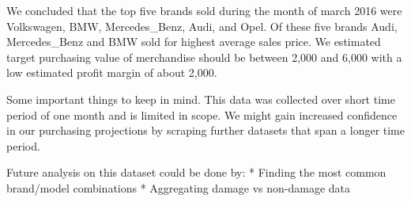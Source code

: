 \documentclass[11pt]{article}
\begin{document}
    We concluded that the top five brands sold during the month of march
2016 were Volkswagen, BMW, Mercedes\_Benz, Audi, and Opel. Of these five
brands Audi, Mercedes\_Benz and BMW sold for highest average sales
price. We estimated target purchasing value of merchandise should be
between 2,000 and 6,000 with a low estimated profit margin of about
2,000.

    Some important things to keep in mind. This data was collected over
short time period of one month and is limited in scope. We might gain
increased confidence in our purchasing projections by scraping further
datasets that span a longer time period.

    Future analysis on this dataset could be done by: * Finding the most
common brand/model combinations * Aggregating damage vs non-damage data


    
    
    
    
\end{document}
